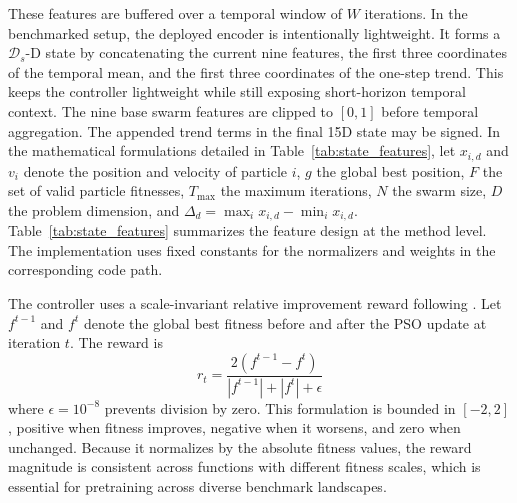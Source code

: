 \documentclass[final,5p,times]{elsarticle}
\newcommand{\symStatedim}{\mathcal{D}_s}
\newcommand{\symPopsize}{N}
\newcommand{\symMaxIters}{T_{\text{max}}}
\newcommand{\symWindowsize}{W}
\begin{document}
These features are buffered over a temporal window of $\symWindowsize$ iterations.
In the benchmarked setup, the deployed encoder is intentionally lightweight. It forms a $\symStatedim$-D state by concatenating the current nine features, the first three coordinates of the temporal mean, and the first three coordinates of the one-step trend.
This keeps the controller lightweight while still exposing short-horizon temporal context.
The nine base swarm features are clipped to $[0,1]$ before temporal aggregation. The appended trend terms in the final 15D state may be signed.
In the mathematical formulations detailed in Table~\ref{tab:state_features}, let $x_{i,d}$ and $v_{i}$ denote the position and velocity of particle $i$, $g$ the global best position, $F$ the set of valid particle fitnesses, $\symMaxIters$ the maximum iterations, $\symPopsize$ the swarm size, $D$ the problem dimension, and $\Delta_d = \max_i x_{i,d} - \min_i x_{i,d}$.
Table~\ref{tab:state_features} summarizes the feature design at the method level. The implementation uses fixed constants for the normalizers and weights in the corresponding code path.

The controller uses a scale-invariant relative improvement reward following \cite{vonEschwege2024Soft}. Let $f^{t-1}$ and $f^{t}$ denote the global best fitness before and after the PSO update at iteration $t$. The reward is
\begin{equation}
r_t = \frac{2\left(f^{t-1} - f^{t}\right)}{\left|f^{t-1}\right| + \left|f^{t}\right| + \epsilon}
\label{eq:reward_total}
\end{equation}
where $\epsilon = 10^{-8}$ prevents division by zero.
This formulation is bounded in $[-2, 2]$, positive when fitness improves, negative when it worsens, and zero when unchanged. Because it normalizes by the absolute fitness values, the reward magnitude is consistent across functions with different fitness scales, which is essential for pretraining across diverse benchmark landscapes.
\end{document}
